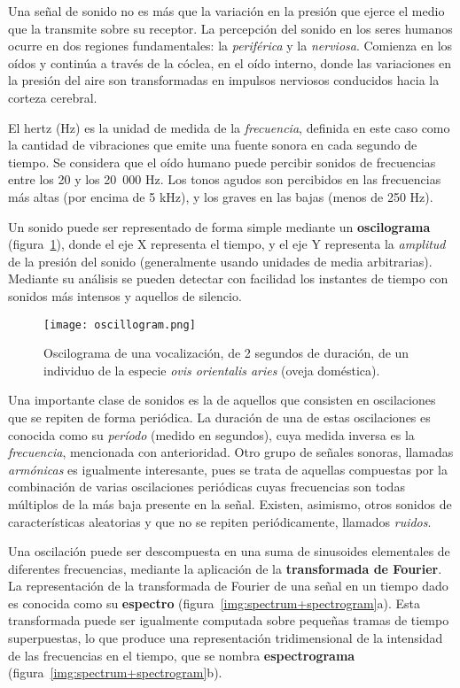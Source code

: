 Una señal de sonido no es más que la variación en la presión que ejerce el medio que la transmite sobre su receptor.
La percepción del sonido en los seres humanos ocurre en dos regiones fundamentales: la \textit{periférica} y la \textit{nerviosa}.
Comienza en los oídos y continúa a través de la cóclea, en el oído interno, donde las variaciones en la presión del aire son transformadas en impulsos nerviosos conducidos hacia la corteza cerebral.

El hertz (Hz) es la unidad de medida de la \textit{frecuencia}, definida en este caso como la cantidad de vibraciones que emite una fuente sonora en cada segundo de tiempo.
Se considera que el oído humano puede percibir sonidos de frecuencias entre los 20 y los 20~000 Hz.
Los tonos agudos son percibidos en las frecuencias más altas (por encima de 5 kHz), y los graves en las bajas (menos de 250 Hz).

Un sonido puede ser representado de forma simple mediante un \textbf{oscilograma} (figura~\ref{img:oscillogram}), donde el eje X representa el tiempo, y el eje Y representa la \textit{amplitud} de la presión del sonido (generalmente usando unidades de media arbitrarias).
Mediante su análisis se pueden detectar con facilidad los instantes de tiempo con sonidos más intensos y aquellos de silencio.

\begin{figure}[!h]
    \centering
    \texttt{[image: oscillogram.png]}
    \caption{Oscilograma de una vocalización, de 2 segundos de duración, de un individuo de la especie \textit{ovis orientalis aries} (oveja doméstica).}
    \label{img:oscillogram}
\end{figure}

Una importante clase de sonidos es la de aquellos que consisten en oscilaciones que se repiten de forma periódica.
La duración de una de estas oscilaciones es conocida como su \textit{período} (medido en segundos), cuya medida inversa es la \textit{frecuencia}, mencionada con anterioridad.
Otro grupo de señales sonoras, llamadas \textit{armónicas} es igualmente interesante, pues se trata de aquellas compuestas por la combinación de varias oscilaciones periódicas cuyas frecuencias son todas múltiplos de la más baja presente en la señal.
Existen, asimismo, otros sonidos de características aleatorias y que no se repiten periódicamente, llamados \textit{ruidos}.

Una oscilación puede ser descompuesta en una suma de sinusoides elementales de diferentes frecuencias, mediante la aplicación de la \textbf{transformada de Fourier}.
La representación de la transformada de Fourier de una señal en un tiempo dado es conocida como su \textbf{espectro} (figura~\ref{img:spectrum+spectrogram}a).
Esta transformada puede ser igualmente computada sobre pequeñas tramas de tiempo superpuestas, lo que produce una representación tridimensional de la intensidad de las frecuencias en el tiempo, que se nombra \textbf{espectrograma} (figura~\ref{img:spectrum+spectrogram}b).

